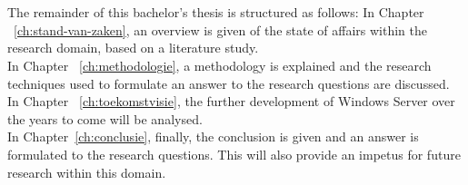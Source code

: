 \section{}
\label{sec:opzet-bachelorproef}

The remainder of this bachelor's thesis is structured as follows:
In Chapter ~\ref{ch:stand-van-zaken}, an overview is given of the state of affairs within the research domain, based on a literature study.\\
In Chapter ~\ref{ch:methodologie}, a methodology is explained and the research techniques used to formulate an answer to the research questions are discussed.\\
In Chapter ~\ref{ch:toekomstvisie}, the further development of Windows Server over the years to come will be analysed. \\
In Chapter~\ref{ch:conclusie}, finally, the conclusion is given and an answer is formulated to the research questions. This will also provide an impetus for future research within this domain.\\
